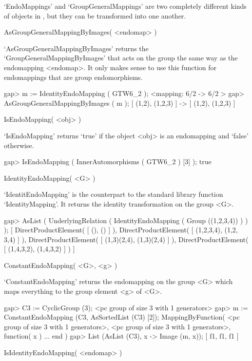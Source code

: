 `EndoMappings' and `GroupGeneralMappings' are two completely different
kinds of objects in {\GAP}, but they can be transformed into one
another.

\>AsGroupGeneralMappingByImages( <endomap> )

`AsGroupGeneralMappingByImages' returns the
`GroupGeneralMappingByImages' that acts on the group the same way as
the endomapping <endomap>. It only makes sense to use this function
for endomappings that are group endomorphisms.

\beginexample
    gap> m := IdentityEndoMapping ( GTW6_2 );
    <mapping: 6/2 -> 6/2 >
    gap> AsGroupGeneralMappingByImages ( m );
    [ (1,2), (1,2,3) ] -> [ (1,2), (1,2,3) ]
\endexample

\>IsEndoMapping( <obj> )

`IsEndoMapping' returns `true' if the object <obj> is an endomapping
and `false' otherwise.

\beginexample
    gap> IsEndoMapping ( InnerAutomorphisms ( GTW6_2 ) [3] );
    true
\endexample

\>IdentityEndoMapping( <G> )

`IdentitEndoMapping' is the counterpart to the {\GAP} standard
library function `IdentityMapping'. It returns the identity
transformation on the group <G>.

\beginexample
    gap> AsList ( UnderlyingRelation ( IdentityEndoMapping ( Group ((1,2,3,4)) ) ) );
    [ DirectProductElement( [ (), () ] ), DirectProductElement( [ (1,2,3,4), (1,2,
       3,4) ] ), DirectProductElement( [ (1,3)(2,4), (1,3)(2,4) ] ),
      DirectProductElement( [ (1,4,3,2), (1,4,3,2) ] ) ]
\endexample

\>ConstantEndoMapping( <G>, <g> )

`ConstantEndoMapping' returns the endomapping on the group <G>
which maps everything to the group element <g> of <G>.

\beginexample
    gap> C3 := CyclicGroup (3);
    <pc group of size 3 with 1 generators>
    gap> m := ConstantEndoMapping (C3, AsSortedList (C3) [2]);
    MappingByFunction( <pc group of size 3 with 
    1 generators>, <pc group of size 3 with 
    1 generators>, function( x ) ... end )
    gap> List (AsList (C3), x -> Image (m, x));
    [ f1, f1, f1 ]
\endexample




\>IsIdentityEndoMapping( <endomap> )

